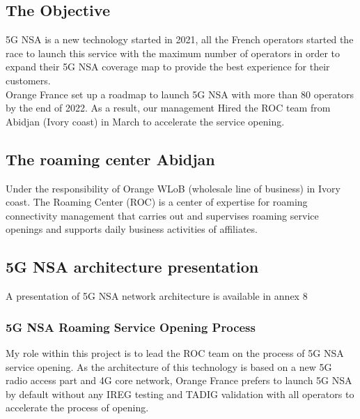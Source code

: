 \subsection{The Objective}
\-\hspace{0.5cm} \acs{5G} \acs{NSA} is a new technology started in 2021, all the French operators started the race to launch this service with the maximum number of operators in order to expand their \acs{5G} \acs{NSA} coverage map to provide the best experience for their customers. \\

Orange France set up a roadmap to launch \acs{5G} \acs{NSA} with more than 80 operators by the end of 2022. As a result, our management Hired the \acs{ROC} team from Abidjan (Ivory coast) in March to accelerate the service opening.\\

\subsection{The roaming center Abidjan}
\-\hspace{0.5cm} Under the responsibility of Orange \acs{WLoB} (wholesale line of business) in Ivory coast. The Roaming Center (\acs{ROC}) is a center of expertise for roaming connectivity management that carries out and supervises roaming service openings and supports daily business activities of affiliates.

\subsection{\acs{5G} \acs{NSA} architecture presentation}
\-\hspace{0.5cm} A presentation of \acs{5G} \acs{NSA} network architecture is available in annex 8 \cite{annexes}

\subsubsection{\acs{5G} \acs{NSA} Roaming Service Opening Process}
\-\hspace{0.5cm} My role within this project is to lead the \acs{ROC} team on the process of \acs{5G} \acs{NSA} service opening. As the architecture of this technology is based on a new \acs{5G} radio access part and \acs{4G} core network, Orange France prefers to launch \acs{5G} \acs{NSA} by default without any \acs{IREG} testing and \acs{TADIG} validation with all operators to accelerate the process of opening. \\

